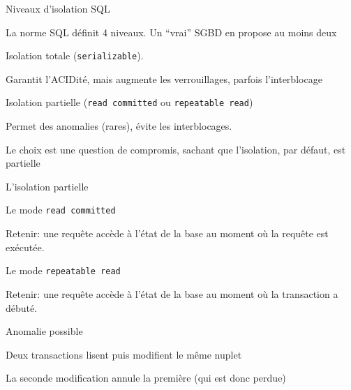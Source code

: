 

\begin{frame}{Niveaux d'isolation SQL}

La norme SQL définit 4 niveaux.
Un ``vrai''  SGBD en propose au moins deux

\vfill

\begin{redbullet}
  \item \alert{Isolation totale} (\texttt{serializable}). 
  
     Garantit l'ACIDité, mais augmente les verrouillages, parfois l'interblocage
   
  \item \alert{Isolation partielle} (\texttt{read committed} 
     ou \texttt{repeatable read}) 
     
     Permet des anomalies (rares), évite les interblocages.
\end{redbullet}
 
 \vfill
 
 Le choix est une question de compromis, sachant que l'isolation,
 par défaut, est partielle

\end{frame}

\begin{frame}{L'isolation partielle}

 Le mode \texttt{read committed}

\vfill
   \alert{Retenir}: une requête accède à l'état de la base \alert{au moment où la
requête est exécutée}.
  
\vfill

Le mode \texttt{repeatable read}

\vfill

\alert{Retenir}: une requête accède à l'état de la base \alert{au moment où la
transaction a débuté}.

\vfill

\alert{Anomalie possible}

\begin{redbullet}
  \item Deux transactions lisent puis modifient le même nuplet 
   \item La seconde modification annule la première (qui est donc perdue)
\end{redbullet}
\end{frame}


